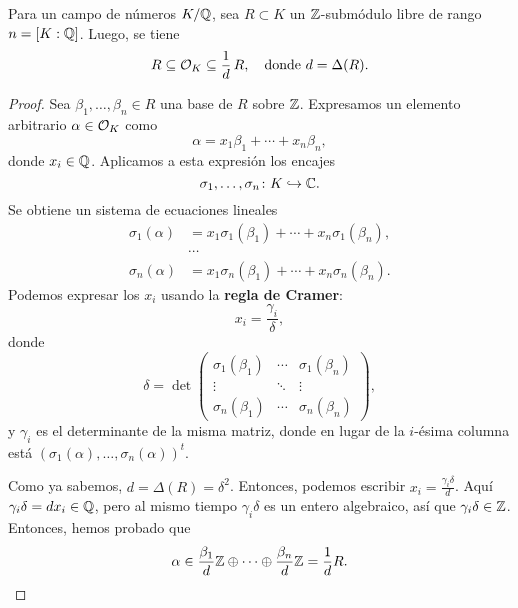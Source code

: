\begin{proposicion}
  \label{prop:OK-y-orden-no-maximal}
  Para un campo de números $K/\mathbb{Q}$, sea $R \subset K$ un $\mathbb{Z}$-submódulo libre
  de rango $n = [K : \mathbb{Q}]$. Luego, se tiene
  \[ R \subseteq \mathcal{O}_K \subseteq \frac{1}{d}\,R,
     \quad\text{donde }d = \Delta (R). \]

  \begin{proof}
    Sea $\beta_1, \ldots, \beta_n \in R$ una base de $R$ sobre $\mathbb{Z}$.
    Expresamos un elemento arbitrario $\alpha \in \mathcal{O}_K$ como
    $$\alpha = x_1 \beta_1 + \cdots + x_n \beta_n,$$
    donde $x_i \in \mathbb{Q}$. Aplicamos a esta expresión los encajes
    $$\sigma_1, \ldots, \sigma_n\colon K \hookrightarrow \mathbb{C}.$$
    Se obtiene un sistema de ecuaciones lineales
    \begin{align*}
      \sigma_1 (\alpha) & =
      x_1 \sigma_1 (\beta_1) + \cdots + x_n \sigma_1 (\beta_n), \\
      & \cdots \\
      \sigma_n (\alpha) & =
      x_1 \sigma_n (\beta_1) + \cdots + x_n \sigma_n (\beta_n).
    \end{align*}
    Podemos expresar los $x_i$ usando la \textbf{regla de Cramer}:
    $$x_i = \frac{\gamma_i}{\delta},$$
    donde
    \[ \delta = \det \begin{pmatrix}
      \sigma_1 (\beta_1) & \cdots & \sigma_1 (\beta_n) \\
      \vdots & \ddots & \vdots \\
      \sigma_n (\beta_1) & \cdots & \sigma_n (\beta_n)
    \end{pmatrix}, \]
    y $\gamma_i$ es el determinante de la misma matriz, donde en lugar de
    la $i$-ésima columna está
    $(\sigma_1 (\alpha), \ldots, \sigma_n (\alpha))^t$.

    Como ya sabemos, $d = \Delta (R) = \delta^2$. Entonces, podemos escribir
    $x_i = \frac{\gamma_i \delta}{d}$. Aquí $\gamma_i \delta = d x_i \in \mathbb{Q}$,
    pero al mismo tiempo $\gamma_i \delta$ es un entero algebraico, así que
    $\gamma_i \delta \in \mathbb{Z}$. Entonces, hemos probado que
    \[ \alpha \in
       \frac{\beta_1}{d}\mathbb{Z} \oplus \cdots \oplus \frac{\beta_n}{d}\mathbb{Z}
       = \frac{1}{d} R. \qedhere \]
  \end{proof}
\end{proposicion}

